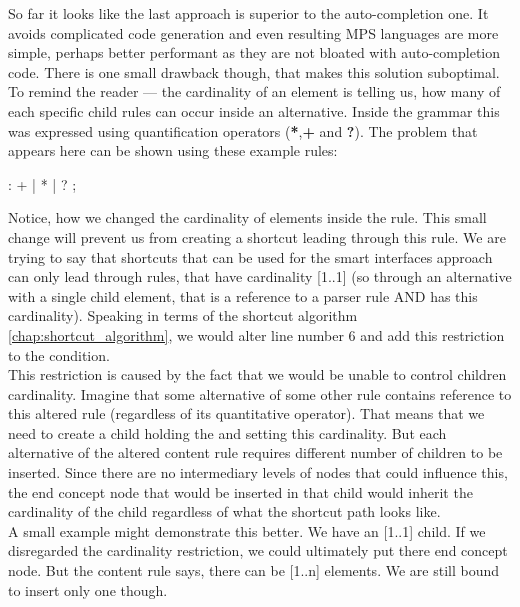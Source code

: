 So far it looks like the last approach is superior to the auto-completion one. It avoids complicated code generation and even resulting MPS languages are more simple, perhaps better performant as they are not bloated with auto-completion code. There is one small drawback though, that makes this solution suboptimal.
\\

To remind the reader --- the cardinality of an element is telling us, how many of each specific child rules can occur inside an alternative. Inside the grammar this was expressed using quantification operators (\textbf{*},\textbf{+} and \textbf{?}). The problem that appears here can be shown using these example rules:

\begin{antlr}
      :   +
             |   *
             |   ?
             ;
\end{antlr}	

Notice, how we changed the cardinality of elements inside the  rule. This small change will prevent us from creating a shortcut leading through this rule. We are trying to say that shortcuts that can be used for the smart interfaces approach can only lead through rules, that have cardinality [1..1] (so through an alternative with a single child element, that is a reference to a parser rule AND has this cardinality). Speaking in terms of the shortcut algorithm \ref{chap:shortcut_algorithm}, we would alter line number 6 and add this restriction to the condition.
\\

This restriction is caused by the fact that we would be unable to control children cardinality. Imagine that some alternative of some other rule contains reference to this altered  rule (regardless of its quantitative operator). That means that we need to create a child holding the  and setting this cardinality. But each alternative of the altered content rule requires different number of children to be inserted. Since there are no intermediary levels of nodes that could influence this, the end concept node that would be inserted in that child would inherit the cardinality of the child regardless of what the shortcut path looks like.
\\

A small example might demonstrate this better. We have an  [1..1] child. If we disregarded the cardinality restriction, we could ultimately put there  end concept node. But the content rule says, there can be [1..n] elements. We are still bound to insert only one though. 

